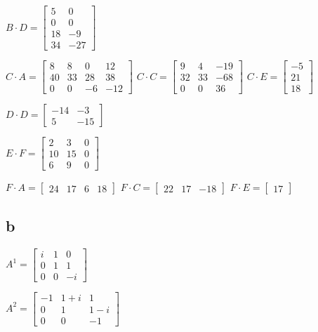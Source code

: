 \documentclass{article}
\begin{document}
$B\cdot D=\begin{bmatrix}
    5&0\\
    0&0\\
    18&-9\\
    34&-27
\end{bmatrix}$


$C\cdot A=\begin{bmatrix}
    8&8&0&12\\
    40&33&28&38\\
    0&0&-6&-12
\end{bmatrix}$
$C\cdot C=\begin{bmatrix}
    9&4&-19\\
    32&33&-68\\
    0&0&36
\end{bmatrix}$
$C\cdot E=\begin{bmatrix}
    -5\\
    21\\
    18
\end{bmatrix}$


$D\cdot D=\begin{bmatrix}
    -14&-3\\
    5&-15
\end{bmatrix}$


$E\cdot F=\begin{bmatrix}
    2&3&0\\
    10&15&0\\
    6&9&0
\end{bmatrix}$


$F\cdot A=\begin{bmatrix}
    24&17&6&18
\end{bmatrix}$
$F\cdot C=\begin{bmatrix}
    22&17&-18
\end{bmatrix}$
$F\cdot E=\begin{bmatrix}
    17
\end{bmatrix}$
\subsection*{b}
$A^1=\begin{bmatrix}
    i&1&0\\
    0&1&1\\
    0&0&-i
\end{bmatrix}$


$A^2=\begin{bmatrix}
    -1&1+i&1\\
    0&1&1-i\\
    0&0&-1
\end{bmatrix}$
\end{document}
